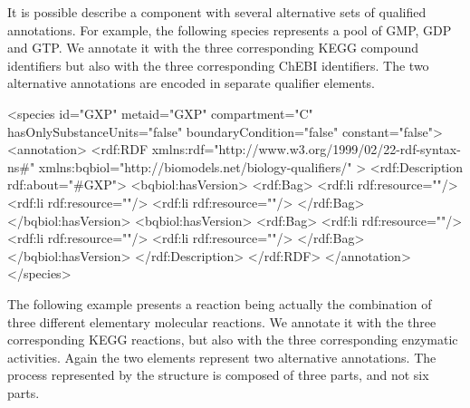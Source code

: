 It is possible describe a component with several alternative sets
of qualified annotations. For example, the following species
represents a pool of  GMP, GDP and GTP. We annotate it with the
three corresponding KEGG compound identifiers but also with the
three corresponding ChEBI identifiers.  The two alternative
annotations are encoded in separate  qualifier
elements.

\begin{example}
<species id="GXP" metaid="GXP" compartment="C"
         hasOnlySubstanceUnits="false" boundaryCondition="false"
         constant="false">
  <annotation>
    <rdf:RDF
      xmlns:rdf="http://www.w3.org/1999/02/22-rdf-syntax-ns\#"
      xmlns:bqbiol="http://biomodels.net/biology-qualifiers/"
    >
      <rdf:Description rdf:about="\#GXP">
        <bqbiol:hasVersion>
          <rdf:Bag>
            <rdf:li rdf:resource="\!"/>
            <rdf:li rdf:resource="\!"/>
            <rdf:li rdf:resource="\!"/>
          </rdf:Bag>
        </bqbiol:hasVersion>
        <bqbiol:hasVersion>
          <rdf:Bag>
            <rdf:li rdf:resource="\!"/>
            <rdf:li rdf:resource="\!"/>
            <rdf:li rdf:resource="\!"/>
          </rdf:Bag>
        </bqbiol:hasVersion>
      </rdf:Description>
    </rdf:RDF>
  </annotation>
</species>
\end{example}

The following example presents a reaction being actually the
combination of three different elementary molecular reactions. We
annotate it with the three corresponding KEGG reactions, but also
with the three corresponding enzymatic activities.  Again the two
 elements represent two alternative annotations.
The process represented by the \Reaction structure is
composed of three parts, and  not six parts.

